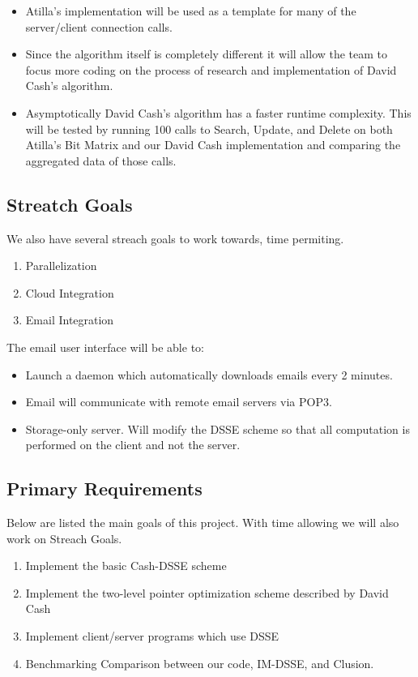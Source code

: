 \begin{itemize}
\item Atilla's implementation will be used as a template for many of the server/client connection calls.

\item Since the algorithm itself is completely different it will allow the team to focus more coding on the process of research and implementation of David Cash's algorithm.

\item Asymptotically David Cash's algorithm has a faster runtime complexity. This will be tested by running 100 calls to Search, Update, and Delete on both Atilla's Bit Matrix and our David Cash implementation and comparing the aggregated data of those calls.
\end{itemize}

\subsection{ Streatch Goals }
We also have several streach goals to work towards, time permiting.

\begin{enumerate}
\item Parallelization
\item Cloud Integration
\item Email Integration
\end{enumerate}


The email user interface will be able to:
\begin{itemize}
\item Launch a daemon which automatically downloads emails every 2 minutes.
\item Email will communicate with remote email servers via POP3.
\end{itemize}
\begin{itemize}
\item Storage-only server. Will modify the DSSE scheme so that all computation is performed on the client and not the server.
\end{itemize}


\subsection{Primary Requirements}
Below are listed the main goals of this project. With time allowing we will also work on Streach Goals.

\begin{enumerate}
\item Implement the basic Cash-DSSE scheme
\item Implement the two-level pointer optimization scheme described by David Cash
\item Implement client/server programs which use DSSE
\item Benchmarking Comparison between our code, IM-DSSE\cite{im-dsse}, and Clusion\cite{clusion}.
\end{enumerate}



